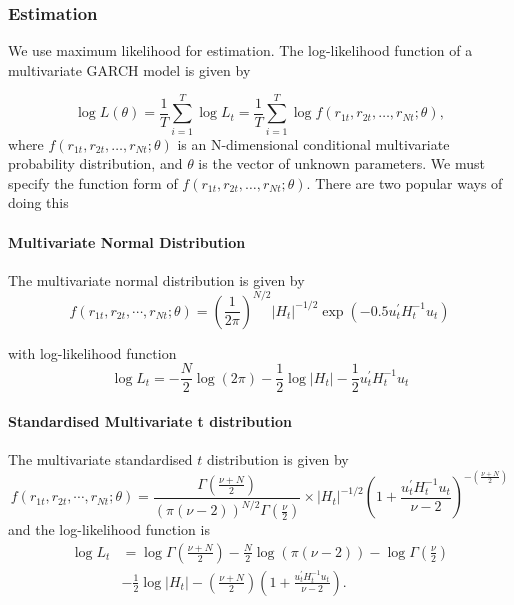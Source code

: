 \documentclass[11pt]{article}
\begin{document}
\subsubsection{Estimation}

We use maximum likelihood for estimation. The log-likelihood function of a multivariate GARCH model is given by

\begin{equation}
    \label{MGARCH log likelihood function}
    \log L(\theta) = \dfrac{1}{T}\sum_{i=1}^T \log L_t = \dfrac{1}{T} \sum_{i=1}^T \log f(r_{1t}, r_{2t}, \ldots, r_{Nt};\theta),
\end{equation}
where $f(r_{1t}, r_{2t}, \ldots, r_{Nt};\theta)$ is an N-dimensional conditional multivariate probability distribution, and $\theta$ is the vector of unknown parameters. We must specify the function form of $f(r_{1t}, r_{2t}, \ldots, r_{Nt};\theta)$. There are two popular ways of doing this

\paragraph{Multivariate Normal Distribution} \mbox{}

The multivariate normal distribution is given by
\begin{equation}
f\left(r_{1 t}, r_{2 t}, \cdots, r_{N t} ; \theta\right)=\left(\frac{1}{2 \pi}\right)^{N / 2}\left|H_t\right|^{-1 / 2} \exp \left(-0.5 u_t^{\prime} H_t^{-1} u_t\right)
\end{equation}

with log-likelihood function 
\begin{equation}
\log L_t=-\frac{N}{2} \log (2 \pi)-\frac{1}{2} \log \left|H_t\right|-\frac{1}{2} u_t^{\prime} H_t^{-1} u_t
\end{equation}

\paragraph{Standardised Multivariate t distribution}

The multivariate standardised $t$ distribution is given by
\begin{equation}
f\left(r_{1 t}, r_{2 t}, \cdots, r_{N t} ; \theta\right)=\frac{\Gamma\left(\frac{\nu+N}{2}\right)}{(\pi(\nu-2))^{N / 2} \Gamma\left(\frac{\nu}{2}\right)} \times\left|H_t\right|^{-1 / 2}\left(1+\frac{u_t^{\prime} H_t^{-1} u_t}{\nu-2}\right)^{-\left(\frac{\nu+N}{2}\right)}
\end{equation}
and the log-likelihood function is
\begin{equation}
\begin{aligned}
\log L_t & =\log \Gamma\left(\frac{\nu+N}{2}\right)-\frac{N}{2} \log (\pi(\nu-2))-\log \Gamma\left(\frac{\nu}{2}\right) \\
& -\frac{1}{2} \log \left|H_t\right|-\left(\frac{\nu+N}{2}\right)\left(1+\frac{u_t^{\prime} H_t^{-1} u_t}{\nu-2}\right) .
\end{aligned}
\end{equation}
\end{document}
